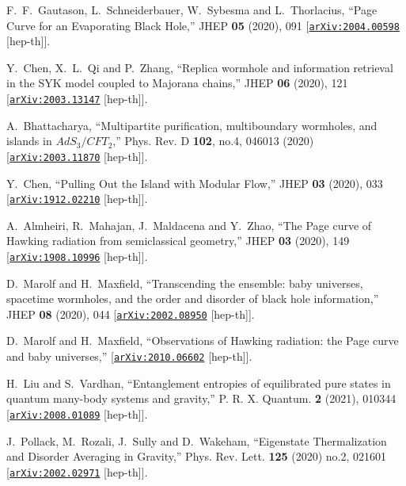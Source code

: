 \documentclass[12pt]{article}
\newcommand \arXiv [1]{\href{http://arxiv.org/abs/#1}{\tt arXiv:#1}}
\begin{document}
\begin{thebibliography}{99}
{%
F.~F.~Gautason, L.~Schneiderbauer, W.~Sybesma and L.~Thorlacius,
``Page Curve for an Evaporating Black Hole,''
JHEP \textbf{05} (2020), 091
[\arXiv{2004.00598} [hep-th]].

Y.~Chen, X.~L.~Qi and P.~Zhang,
``Replica wormhole and information retrieval in the SYK model coupled to Majorana chains,''
JHEP \textbf{06} (2020), 121
[\arXiv{2003.13147} [hep-th]].

A.~Bhattacharya,
``Multipartite purification, multiboundary wormholes, and islands in $AdS_3/CFT_2$,''
Phys. Rev. D \textbf{102}, no.4, 046013 (2020)
[\arXiv{2003.11870} [hep-th]].


Y.~Chen,
``Pulling Out the Island with Modular Flow,''
JHEP \textbf{03} (2020), 033
[\arXiv{1912.02210} [hep-th]].




A.~Almheiri, R.~Mahajan, J.~Maldacena and Y.~Zhao,
``The Page curve of Hawking radiation from semiclassical geometry,''
JHEP \textbf{03} (2020), 149
[\arXiv{1908.10996} [hep-th]].

D.~Marolf and H.~Maxfield,
``Transcending the ensemble: baby universes, spacetime wormholes, and the order and disorder of black hole information,''
JHEP \textbf{08} (2020), 044
[\arXiv{2002.08950} [hep-th]].

D.~Marolf and H.~Maxfield,
``Observations of Hawking radiation: the Page curve and baby universes,''
[\arXiv{2010.06602} [hep-th]].


H.~Liu and S.~Vardhan,
``Entanglement entropies of equilibrated pure states in quantum many-body systems and gravity,''
P. R. X. Quantum. \textbf{2} (2021), 010344
[\arXiv{2008.01089} [hep-th]].

J.~Pollack, M.~Rozali, J.~Sully and D.~Wakeham,
``Eigenstate Thermalization and Disorder Averaging in Gravity,''
Phys. Rev. Lett. \textbf{125} (2020) no.2, 021601
[\arXiv{2002.02971} [hep-th]].

}
\end{thebibliography}
\end{document}
